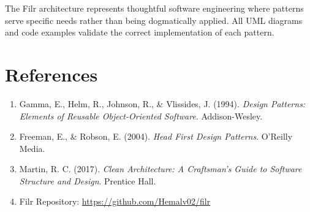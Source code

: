 \documentclass[11pt]{article}
\begin{document}
The Filr architecture represents thoughtful software engineering where patterns serve specific needs rather than being dogmatically applied. All UML diagrams and code examples validate the correct implementation of each pattern.

\section{References}

\begin{enumerate}
    \item Gamma, E., Helm, R., Johnson, R., \& Vlissides, J. (1994). \textit{Design Patterns: Elements of Reusable Object-Oriented Software}. Addison-Wesley.
    \item Freeman, E., \& Robson, E. (2004). \textit{Head First Design Patterns}. O'Reilly Media.
    \item Martin, R. C. (2017). \textit{Clean Architecture: A Craftsman's Guide to Software Structure and Design}. Prentice Hall.
    \item Filr Repository: \url{https://github.com/Hemalv02/filr}
\end{enumerate}
\end{document}
